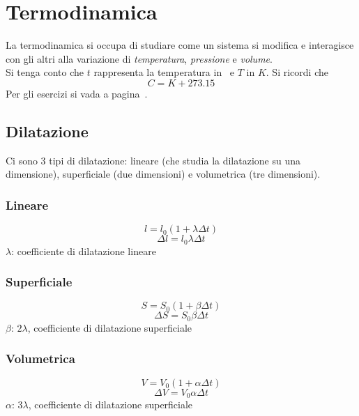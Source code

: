 
\section{Termodinamica}\label{sec:termodinamica}
La termodinamica si occupa di studiare come un sistema si modifica e interagisce con gli altri
alla variazione di \emph{temperatura}, \emph{pressione} e \emph{volume}.\\
Si tenga conto che $t$ rappresenta la temperatura in \textcelsius\ e $T$ in $K$. Si ricordi che
\begin{equation*}
C = K + 273.15
\end{equation*}
Per gli esercizi si vada a pagina~\pageref{ex:termodinamica}.

\subsection{Dilatazione}
Ci sono 3 tipi di dilatazione: lineare (che studia la dilatazione su una dimensione), superficiale 
(due dimensioni) e volumetrica (tre dimensioni).

\subsubsection{Lineare}
\begin{equation*}
l = l_0\left(1+\lambda\Delta t\right)
\end{equation*}
\begin{equation*}
\Delta l = l_0\lambda\Delta t
\end{equation*}
$\lambda$: coefficiente di dilatazione lineare

\subsubsection{Superficiale}
\begin{equation*}
S = S_0\left(1+\beta\Delta t\right)
\end{equation*}
\begin{equation*}
\Delta S = S_0\beta\Delta t
\end{equation*}
$\beta$: $2\lambda$, coefficiente di dilatazione superficiale

\subsubsection{Volumetrica}
\begin{equation*}
V = V_0\left(1+\alpha\Delta t\right)
\end{equation*}
\begin{equation*}
\Delta V = V_0\alpha\Delta t
\end{equation*}
$\alpha$: $3\lambda$, coefficiente di dilatazione superficiale\\

